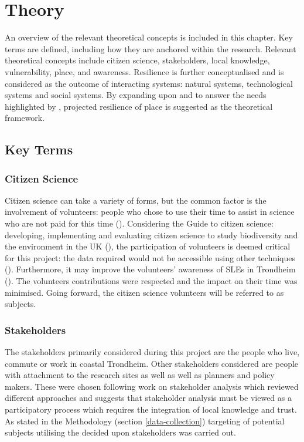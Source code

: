 
\chapter{Theory}


An overview of the relevant theoretical concepts is included in this chapter. Key terms are defined, including how they are anchored within the research. Relevant theoretical concepts include citizen science, stakeholders, local knowledge, vulnerability, place, and awareness. Resilience is further conceptualised and is considered as the outcome of interacting systems: natural systems, technological systems and social systems. By expanding upon \cite{cutter_place-based_2008} and \cite{cutter_community_2020} to answer the needs highlighted by \cite{rasanen_conceptualizing_2020}, projected resilience of place is suggested as the theoretical framework.

\section{Key Terms}


\subsection{Citizen Science}
Citizen science can take a variety of forms, but the common factor is the involvement of volunteers: people who chose to use their time to assist in science who are not paid for this time (\cite{pocock_choosing_2014}). Considering the Guide to citizen science: developing, implementing and evaluating citizen science to study biodiversity and the environment in the UK (\cite{tweddle_guide_2012}), the participation of volunteers is deemed critical for this project: the data required would not be accessible using other techniques (\cite{tweddle_guide_2012}). Furthermore, it may improve the volunteers' awareness of SLEs in Trondheim (\cite{gerkensmeier_governing_2018}).  The volunteers contributions were respected and the impact on their time was minimised. Going forward, the citizen science volunteers will be referred to as subjects. 

\subsection{Stakeholders}
The stakeholders primarily considered during this project are the people who live, commute or work in coastal Trondheim. Other stakeholders considered are people with attachment to the research sites as well as well as planners and policy makers. These were chosen following \cite{reed_stakeholder_2008} work on stakeholder analysis which reviewed different approaches and suggests that stakeholder analysis must be viewed as a participatory process which requires the integration of local knowledge and trust. As stated in the Methodology (section \ref{data-collection}) targeting of potential subjects utilising the decided upon stakeholders was carried out. 


